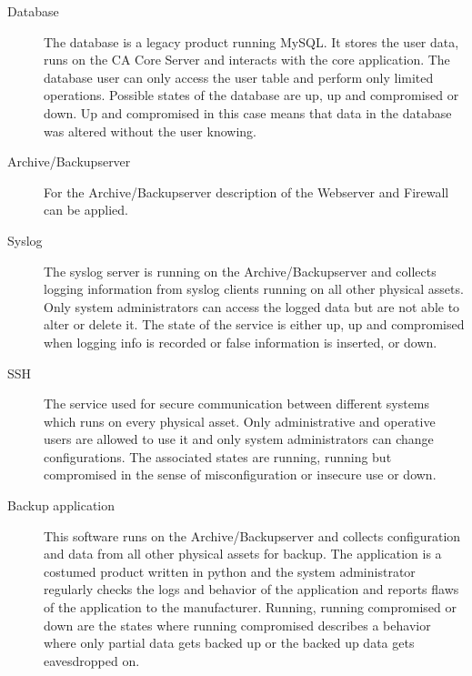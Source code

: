 \documentclass[a4paper, toc=index, 12pt, DIV14, twoside, BCOR2cm, headsepline, numbers=noenddot, bibliography=totoc]{scrbook}
\begin{document}
\begin{description}
\item[Database ] The database is a legacy product running MySQL. It stores the user data, runs on the CA Core Server and interacts with the core application. The database user can only access the user table and perform only limited operations. Possible states of the database are up, up and compromised or down. Up and compromised in this case means that data in the database was altered without the user knowing.
\item[Archive/Backupserver ] For the Archive/Backupserver description of the Webserver and Firewall can be applied. 
\item[Syslog ] The syslog server is running on the Archive/Backupserver and collects logging information from syslog clients running on all other physical assets. Only system administrators can access the logged data but are not able to alter or delete it. The state of the service is either up, up and compromised when logging info is recorded or false information is inserted, or down.
\item[SSH ] The service used for secure communication between different systems which runs on every physical asset. Only administrative and operative users are allowed to use it and only system administrators can change configurations. The associated states are running, running but compromised in the sense of misconfiguration or insecure use or down.
\item[Backup application ] This software runs on the Archive/Backupserver and collects configuration and data from all other physical assets for backup. The application is a costumed product written in python and the system administrator regularly checks the logs and behavior of the application and reports flaws of the application to the manufacturer. Running, running compromised or down are the states where running compromised describes a behavior where only partial data gets backed up or the backed up data gets eavesdropped on.
\end{description}
\end{document}
